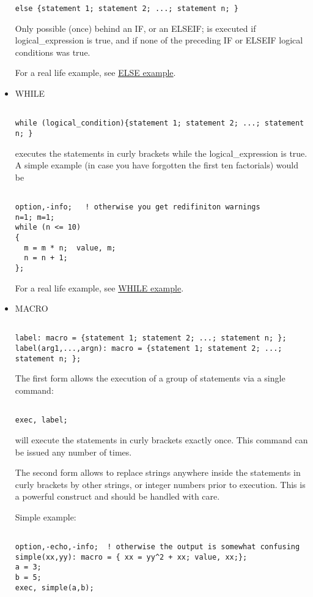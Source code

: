 \begin{itemize}
\begin{verbatim}
else {statement 1; statement 2; ...; statement n; }
\end{verbatim} Only possible (once) behind an IF, or an ELSEIF; is executed if  logical\_expression is true, and if none of the preceding IF or ELSEIF logical conditions was true. 

 For a real life example, see \href{foot.html}{ELSE example}. 


	\item WHILE
\begin{verbatim}

while (logical_condition){statement 1; statement 2; ...; statement n; }
\end{verbatim} executes the statements in curly brackets while the logical\_expression is true. A simple example (in case you have forgotten the first ten factorials) would be 
\begin{verbatim}

option,-info;   ! otherwise you get redifiniton warnings
n=1; m=1;
while (n <= 10)
{
  m = m * n;  value, m;
  n = n + 1;
};

\end{verbatim}
For a real life example, see \href{foot.html}{WHILE example}.

	\item MACRO
\begin{verbatim}

label: macro = {statement 1; statement 2; ...; statement n; };
label(arg1,...,argn): macro = {statement 1; statement 2; ...; statement n; };
\end{verbatim} The first form allows the execution of a group of statements via a single command: 
\begin{verbatim}

exec, label;
\end{verbatim} will execute the statements in curly brackets exactly once. This command can be issued any number of times. 

 The second form allows to replace strings anywhere inside the statements in curly brackets by other strings, or integer numbers prior to execution. This is a powerful construct and should be handled with care. 

 Simple example: 
\begin{verbatim}

option,-echo,-info;  ! otherwise the output is somewhat confusing
simple(xx,yy): macro = { xx = yy^2 + xx; value, xx;};
a = 3;
b = 5;
exec, simple(a,b);
\end{verbatim}


\end{itemize}
